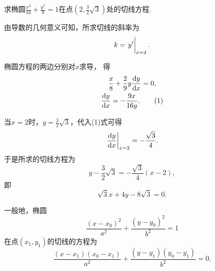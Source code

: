 \begin{example}
求椭圆\(\frac{x^2}{16}+\frac{y^2}{9}=1\)在点\(\left(2,\frac32\sqrt3\right)\)处的切线方程.
\begin{solution}
由导数的几何意义可知，所求切线的斜率为\begin{equation*}
	k = \eval{y'}_{x=2}.
\end{equation*}

椭圆方程的两边分别对\(x\)求导，
得\begin{gather*}
	\frac{x}{8}+\frac{2}{9}y\dv{y}{x}=0, \\
	\dv{y}{x}=-\frac{9x}{16y}.
	\tag{1}
\end{gather*}

当\(x=2\)时，\(y=\frac{3}{2}\sqrt3\)，代入(1)式可得\begin{equation*}
	\eval{\dv{y}{x}}_{x=2}=-\frac{\sqrt3}{4}.
\end{equation*}
于是所求的切线方程为\begin{equation*}
	y-\frac{3}{2}\sqrt3 = -\frac{\sqrt3}{4}(x-2),
\end{equation*}
即\begin{equation*}
	\sqrt3 x + 4 y - 8\sqrt3 = 0.
\end{equation*}
\end{solution}
\end{example}
\begin{remark}
一般地，椭圆\begin{equation*}
	\frac{(x-x_0)^2}{a^2} + \frac{(y-y_0)^2}{b^2} = 1
\end{equation*}
在点\((x_1,y_1)\)的切线的方程为\begin{equation*}
	\frac{(x-x_1)(x_0-x_1)}{a^2} + \frac{(y-y_1)(y_0-y_1)}{b^2} = 0.
\end{equation*}
\end{remark}


